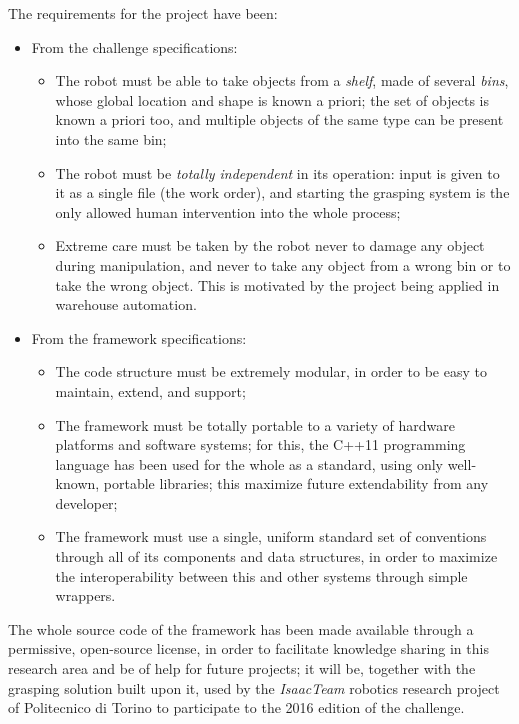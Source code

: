 \documentclass[a4paper,11pt]{article}
\begin{document}
The requirements for the project have been:
\begin{itemize}
\item{From  the challenge specifications:
    \begin{itemize}
    \item{The robot must be able to take objects from a \emph{shelf},
      made of several \emph{bins}, whose global location and shape is known
      a priori; the set of objects is known a priori too, and multiple objects
      of the same type can be present into the same bin;}
    \item{The robot must be \emph{totally independent} in its
      operation: input is given to it as a single file (the work
      order),
      and starting the grasping system is the only allowed
      human intervention into the whole process;}
    \item{Extreme care must be taken by the robot never to damage any
      object during manipulation, and never to take any object from a
      wrong bin or to take the wrong object. This is motivated by the
      project being applied in warehouse automation.}
    \end{itemize}
    }
\item{From the framework specifications:
  \begin{itemize}
  \item{The code structure must be extremely modular, in order to be
    easy to maintain, extend, and support;}
  \item{The framework must be totally portable to a variety of hardware
    platforms and software systems; for this, the C++11 programming language has been used for the
  whole as a standard, using only well-known, portable libraries; this
  maximize future extendability from any developer;}
  \item{The framework must use a single, uniform standard set of conventions through all
      of its components and data structures, in order to maximize the
    interoperability between this and other systems through simple wrappers.}
  \end{itemize}
  }
\end{itemize}

The whole source code of the framework has been made available through a
permissive, open-source license, in order to facilitate knowledge sharing in
this research area and be of help for future projects; it will be, together with
the grasping solution built upon it, used by the \emph{IsaacTeam} robotics research
project of Politecnico di Torino to participate to the 2016 edition of the
challenge.
\end{document}

